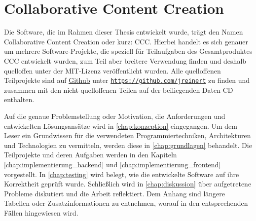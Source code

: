 \section{Collaborative Content Creation}
\label{sec:e_collaborative_content_creation}

Die Software, die im Rahmen dieser Thesis entwickelt wurde, trägt den Namen
Collaborative Content Creation oder kurz: CCC.  Hierbei handelt es sich genauer
um mehrere Software-Projekte, die speziell für Teilaufgaben des Gesamtproduktes
CCC entwickelt wurden, zum Teil aber breitere Verwendung finden und deshalb
quelloffen unter der MIT-Lizenz \cite{mit} veröffentlicht wurden.  Alle
quelloffenen Teilprojekte sind auf \href{https://github.com}{Github} unter
\texttt{\href{https://github.com/jreinert}{https://github.com/jreinert}} zu
finden und zusammen mit den nicht-quelloffenen Teilen auf der beiliegenden
Daten-CD enthalten.

Auf die genaue Problemstellung oder Motivation, die Anforderungen und
entwickelten Lösungsansätze wird in \cref{chap:konzeption} eingegangen.  Um dem
Leser ein Grundwissen für die verwendeten Programmiertechniken, Architekturen
und Technologien zu vermitteln, werden diese in \cref{chap:grundlagen}
behandelt.  Die Teilprojekte und deren Aufgaben werden in den Kapiteln
\ref{chap:implementierung_backend} und \ref{chap:implementierung_frontend}
vorgestellt.  In \cref{chap:testing} wird belegt, wie die entwickelte
Software auf ihre Korrektheit geprüft wurde.  Schließlich wird in
\cref{chap:diskussion} über aufgetretene Probleme diskutiert und die Arbeit
reflektiert.  Dem Anhang sind längere Tabellen oder Zusatzinformationen
zu entnehmen, worauf in den entsprechenden Fällen hingewiesen wird.
